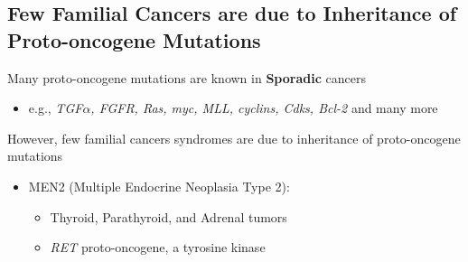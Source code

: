 \documentclass[10pt]{article}
\begin{document}
\subsection*{Few Familial Cancers are due to Inheritance of Proto-oncogene Mutations}
Many proto-oncogene mutations are known in \textbf{Sporadic} cancers
\begin{itemize}
	\item e.g., \textit{TGF$\alpha$, FGFR, Ras, myc, MLL, cyclins, Cdks, Bcl-2} and many more
\end{itemize}
However, few familial cancers syndromes are due to inheritance of proto-oncogene mutations
\begin{itemize}
	\item MEN2 (Multiple Endocrine Neoplasia Type 2):
	\begin{itemize}
        \item Thyroid, Parathyroid, and Adrenal tumors
        \item \textit{RET} proto-oncogene, a tyrosine kinase
    \end{itemize}
\end{itemize}
\end{document}
